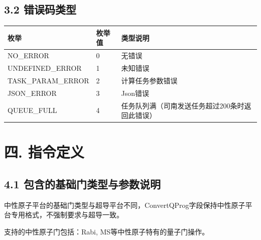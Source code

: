 \documentclass{ctexart}
\begin{document}
\subsection{3.2 错误码类型}

\begin{longtable}{|l|l|l|}
\hline
\textbf{\textbf{枚举}} & \textbf{\textbf{枚举值}} & \textbf{\textbf{类型说明}} \\
\hline
NO_ERROR & 0 & 无错误 \\
UNDEFINED_ERROR & 1 & 未知错误 \\
TASK_PARAM_ERROR & 2 & 计算任务参数错误 \\
JSON_ERROR & 3 & Json错误 \\
QUEUE_FULL & 4 & 任务队列满（司南发送任务超过200条时返回此错误） \\
\hline
\end{longtable}

\section{四. 指令定义}

\subsection{4.1 包含的基础门类型与参数说明}

中性原子平台的基础门类型与超导平台不同，ConvertQProg字段保持中性原子平台专用格式，不强制要求与超导一致。

支持的中性原子门包括：Rabi, MS等中性原子特有的量子门操作。
\end{document}
